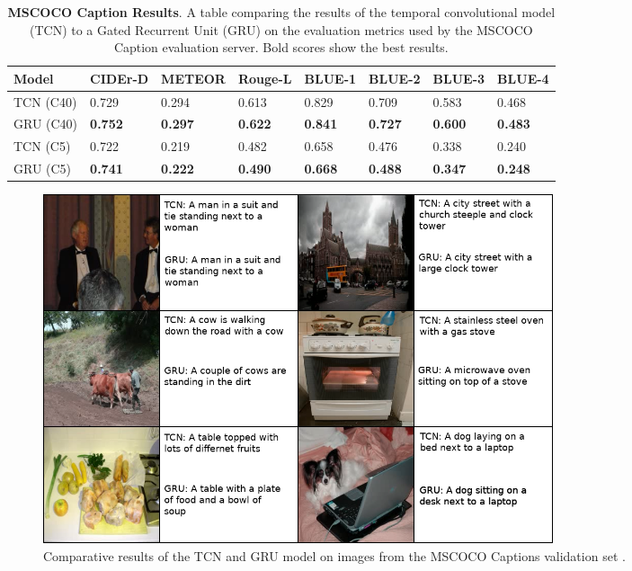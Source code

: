 \documentclass[a4paper, twoside]{article}
\begin{document}
\begin{table}
\begin{center}
    \begin{tabular}{| l | l | l | l | l | l| l | l  |}
    \hline
    Model & CIDEr-D & METEOR & Rouge-L & BLUE-1 & BLUE-2 & BLUE-3 & BLUE-4\\ \hline \hline
    TCN (C40) & 0.729 & 0.294 & 0.613 & 0.829 & 0.709 & 0.583 & 0.468 \\ \hline
   	GRU (C40) & \textbf{0.752} & \textbf{0.297}& \textbf{0.622}& \textbf{0.841}& \textbf{0.727}& \textbf{0.600}& \textbf{0.483}\\ \hline \hline
    TCN (C5) & 0.722 & 0.219& 0.482& 0.658& 0.476& 0.338& 0.240\\ \hline
    GRU (C5) & \textbf{0.741} & \textbf{0.222}& \textbf{0.490}& \textbf{0.668}& \textbf{0.488}& \textbf{0.347}& \textbf{0.248}\\ \hline
    \end{tabular}
    \caption{\textbf{MSCOCO Caption Results}. A table comparing the results of the temporal convolutional model (TCN) to a Gated Recurrent Unit (GRU) on the evaluation metrics used by the MSCOCO Caption evaluation server. Bold scores show the best results.} \label{tabimagecaptioning}
\end{center}
\end{table}

\begin{figure}[h]
\begin{center}
    \includegraphics[width=15cm]{captionsbig.png}\caption{Comparative results of the TCN and GRU model on images from the MSCOCO Captions validation set \cite{mscoco}.} \label{figimagecaptioning}
\end{center}
\end{figure}
\end{document}
